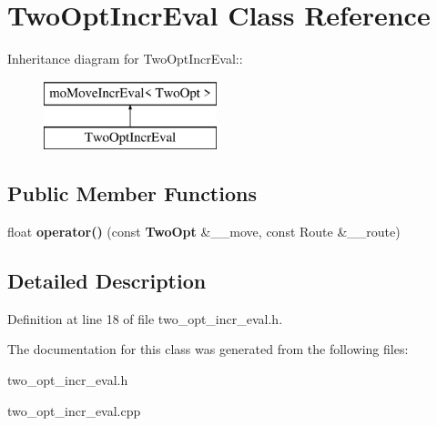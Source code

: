 \section{TwoOptIncrEval Class Reference}
\label{class_two_opt_incr_eval}
Inheritance diagram for TwoOptIncrEval::\begin{figure}[H]
\begin{center}
\leavevmode
\includegraphics[height=2cm]{class_two_opt_incr_eval}
\end{center}
\end{figure}
\subsection*{Public Member Functions}
\begin{CompactItemize}
\item 
float {\bf operator()} (const {\bf TwoOpt} \&\_\-\_\-move, const Route \&\_\-\_\-route)\label{class_two_opt_incr_eval_4574d0b22065be5b59b88791e2b61138}

\end{CompactItemize}


\subsection{Detailed Description}




Definition at line 18 of file two\_\-opt\_\-incr\_\-eval.h.

The documentation for this class was generated from the following files:\begin{CompactItemize}
\item 
two\_\-opt\_\-incr\_\-eval.h\item 
two\_\-opt\_\-incr\_\-eval.cpp\end{CompactItemize}
